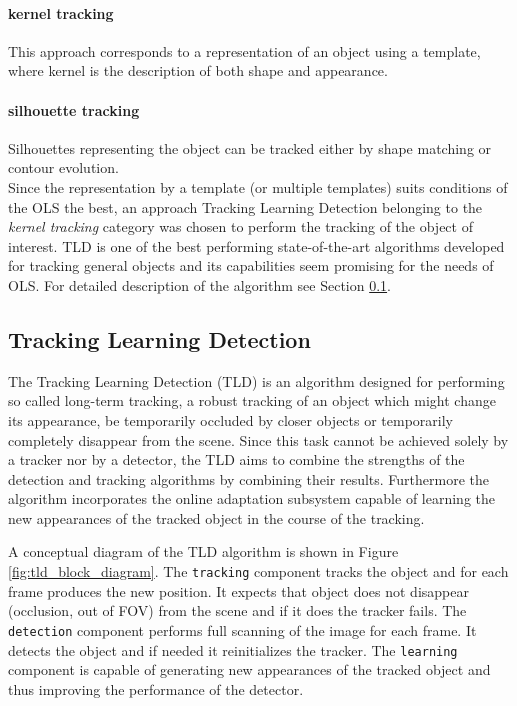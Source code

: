 \paragraph{kernel tracking} 
This approach corresponds to a representation of an object using a template, where kernel is the description of both shape and appearance.

\paragraph{silhouette tracking}
Silhouettes representing the object can be tracked either by shape matching or contour evolution. \\

Since the representation by a template (or multiple templates) suits conditions of the OLS the best, an approach Tracking Learning Detection belonging to the \textit{kernel tracking} category was chosen to perform the tracking of the object of interest. TLD is one of the best performing state-of-the-art algorithms developed for tracking general objects and its capabilities seem promising for the needs of OLS. For detailed description of the algorithm see Section \ref{txt:tracking_learning_detection}.

\subsection{Tracking Learning Detection} \label{txt:tracking_learning_detection}

The Tracking Learning Detection (TLD) \cite{Kalal:2012:TRA:2225045.2225082} is an algorithm designed for performing so called long-term tracking, a robust tracking of an object which might change its appearance, be temporarily occluded by closer objects or temporarily completely disappear from the scene. Since this task cannot be achieved solely by a tracker nor by a detector, the TLD aims to combine the strengths of the detection and tracking algorithms by combining their results. Furthermore the algorithm incorporates the online adaptation subsystem capable of learning the new appearances of the tracked object in the course of the tracking.

A conceptual diagram of the TLD algorithm is shown in Figure \ref{fig:tld_block_diagram}. The \texttt{tracking} component tracks the object and for each frame produces the new position. It expects that object does not disappear (occlusion, out of FOV) from the scene and if it does the tracker fails. The \texttt{detection} component performs full scanning of the image for each frame. It detects the object and if needed it reinitializes the tracker. The \texttt{learning} component is capable of generating new appearances of the tracked object and thus improving the performance of the detector. 

